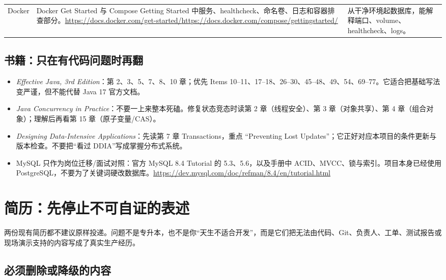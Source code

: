 \documentclass[a4paper,11pt]{article}
\begin{document}
\begin{longtable}{>{\raggedright\arraybackslash}p{} >{\raggedright\arraybackslash}p{} >{\raggedright\arraybackslash}p{}}
Docker & Docker Get Started 与 Compose Getting Started 中服务、healthcheck、命名卷、日志和容器排查部分。\newline \url{https://docs.docker.com/get-started/}\newline \url{https://docs.docker.com/compose/gettingstarted/} & 从干净环境起数据库，能解释端口、volume、healthcheck、logs。 \\
\end{longtable}

\subsection{书籍：只在有代码问题时再翻}

\begin{itemize}
  \item \textit{Effective Java, 3rd Edition}：第 2、3、5、7、8、10 章；优先 Items 10--11、17--18、26--30、45--48、49、54、69--77。它适合把基础写法变严谨，但不能代替 Java 17 官方文档。
  \item \textit{Java Concurrency in Practice}：不要一上来整本死磕。修复状态竞态时读第 2 章（线程安全）、第 3 章（对象共享）、第 4 章（组合对象）；理解后再看第 15 章（原子变量/CAS）。
  \item \textit{Designing Data-Intensive Applications}：先读第 7 章 Transactions，重点 ``Preventing Lost Updates''；它正好对应本项目的条件更新与版本检查。不要把“看过 DDIA”写成掌握分布式系统。
  \item MySQL 只作为岗位迁移/面试对照：官方 MySQL 8.4 Tutorial 的 5.3、5.6，以及手册中 ACID、MVCC、锁与索引。项目本身已经使用 PostgreSQL，不要为了关键词硬改数据库。\newline \url{https://dev.mysql.com/doc/refman/8.4/en/tutorial.html}
\end{itemize}

\section{简历：先停止不可自证的表述}

两份现有简历都不建议原样投递。问题不是专升本，也不是你“天生不适合开发”，而是它们把无法由代码、Git、负责人、工单、测试报告或现场演示支持的内容写成了真实生产经历。

\subsection{必须删除或降级的内容}
\end{document}
